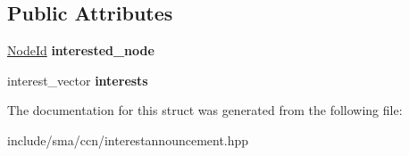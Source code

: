 \subsection*{Public Attributes}
\begin{DoxyCompactItemize}
\item 
\hypertarget{structsma_1_1InterestAnnouncement_a763f4cff194058893188ee054d9d3b56}{\hyperlink{structsma_1_1NodeId}{Node\-Id} {\bfseries interested\-\_\-node}}\label{structsma_1_1InterestAnnouncement_a763f4cff194058893188ee054d9d3b56}

\item 
\hypertarget{structsma_1_1InterestAnnouncement_afab7a6d2c394ac902d27c8c9ba7a9e70}{interest\-\_\-vector {\bfseries interests}}\label{structsma_1_1InterestAnnouncement_afab7a6d2c394ac902d27c8c9ba7a9e70}

\end{DoxyCompactItemize}


The documentation for this struct was generated from the following file\-:\begin{DoxyCompactItemize}
\item 
include/sma/ccn/interestannouncement.\-hpp\end{DoxyCompactItemize}
